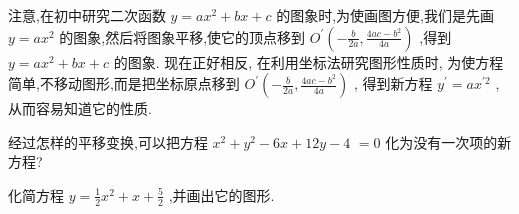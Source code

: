 \documentclass[lang=cn,newtx,10.5pt,scheme=chinese]{elegantbook}
\begin{document}
注意,在初中研究二次函数 \(y = a{x}^{2} + {bx} + c\) 的图象时,为使画图方便,我们是先画 \(y = a{x}^{2}\) 的图象,然后将图象平移,使它的顶点移到 \({O}^{\prime }\left( {-\frac{b}{2a},\frac{{4ac} - {b}^{2}}{4a}}\right)\) ,得到 \(y = a{x}^{2} + {bx} + c\) 的图象. 现在正好相反, 在利用坐标法研究图形性质时, 为使方程简单,不移动图形,而是把坐标原点移到 \({O}^{\prime }\left( {-\frac{b}{2a},\frac{{4ac} - {b}^{2}}{4a}}\right)\) , 得到新方程 \({y}^{\prime } = a{x}^{\prime 2}\) ,从而容易知道它的性质.

\begin{problemset}[练习]

\item 经过怎样的平移变换,可以把方程 \({x}^{2} + {y}^{2} - {6x} + {12y} - 4\) \(= 0\) 化为没有一次项的新方程?

\item 化简方程 \(y = \frac{1}{2}{x}^{2} + x + \frac{5}{2}\) ,并画出它的图形.

\end{problemset}
\end{document}

